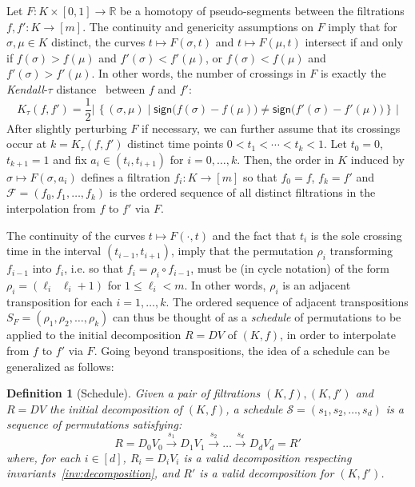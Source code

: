 \documentclass[sn-mathphys]{sn-jnl}
\newtheorem{definition}{Definition}
\begin{document}
Let $F : K \times [0,1] \to \mathbb{R}$ be a homotopy of pseudo-segments between the  filtrations 
$f,f' : K \rightarrow [m]$.
The continuity and genericity assumptions on $F$ imply that for $ \sigma,\mu \in K$ distinct, 
 the curves   $t \mapsto F(\sigma ,t)$ and 
$t \mapsto F(\mu,t)$ intersect if and only if
 $f(\sigma) > f(\mu)$ and $f'(\sigma)  < f'(\mu)$, or $f(\sigma) < f(\mu)$ and $f'(\sigma)  > f'(\mu)$. 
 In other words, the number of crossings in $F$ is 
 exactly the  \emph{Kendall}-$\tau$ distance~\cite{diaconis1977spearman} between $f$ and $f'$: 
\begin{equation}\label{eq:kendall_dist}
	K_\tau(f, f') = 
 \frac{1}{2} \left\lvert \, \left\{(\sigma, \mu) \mid \mathsf{sign}\big(f(\sigma) - f(\mu) \big) \neq \mathsf{sign}\big(f'(\sigma) - f'(\mu)\big) \right\} \, \right\rvert
\end{equation}
After slightly perturbing $F$ if necessary,  we can further assume that its crossings occur at  $k = K_\tau(f,f')$ distinct time points $0< t_1 < \cdots < t_k < 1$. 
Let $t_0 = 0$, $t_{k+1}= 1$ and fix 
$a_i \in (t_{i}, t_{i + 1})$ for $i=0, \ldots, k$. 
Then, the order in $K$ induced by $\sigma \mapsto F(\sigma, a_i)$
defines a filtration $f_i : K \rightarrow [m]$
so  that $f_0 = f$, $f_k = f'$ and 
$\mathcal{F} = (f_0, f_1,\ldots, f_k)$ is the ordered sequence of all distinct filtrations in the interpolation from $f$ to $f'$ via $F$.

The continuity of the curves $t\mapsto F(\cdot, t)$ and the fact that $t_i$ is the sole crossing time  in the interval $(t_{i-1}, t_{i+1})$, imply that the
permutation $\rho_i $   
transforming $f_{i-1}$ into $f_i$, i.e. so that  $f_i = \rho_i \circ f_{i-1}$, must be (in cycle notation) of the form 
$\rho_i = (\ell_i \;\; \ell_i +1 )$ for $1 \leq \ell_i < m$. In other words, $\rho_i$ is an adjacent transposition for each $i =1,\ldots, k$.
The ordered sequence of adjacent transpositions  
$S_F = (\rho_1, \rho_2, \ldots, \rho_k)$ can thus be thought of as a \emph{schedule} of permutations to be applied to the initial decomposition $R = DV$ of $(K,f)$, in order to   interpolate from $f$ to $f'$ via $F$. 
Going beyond transpositions, the idea of a schedule can be generalized as follows:
\begin{definition}[Schedule]\label{def:schedule}
Given a pair of filtrations $(K, f), (K,f')$ 
and $R = DV$ the initial decomposition of $(K, f)$, a \emph{schedule}  $\mathcal{S} = (s_1, s_2, \dots, s_d )$ is a sequence of permutations  satisfying: 
	\begin{equation}\label{eq:rv_seq_schedule}
   		R = D_0 V_0 \overset{s_1}{\to} D_1 V_{1} \overset{s_2}{\to} \dots \overset{s_d}{\to} D_d V_{d} = R'
   	\end{equation}
   	where, for each $i \in [d]$, $R_i = D_i V_i$ is a valid decomposition respecting invariants~\ref{inv:decomposition}, and $R'$ is a valid decomposition for $(K,f')$.
\end{definition}
\end{document}

